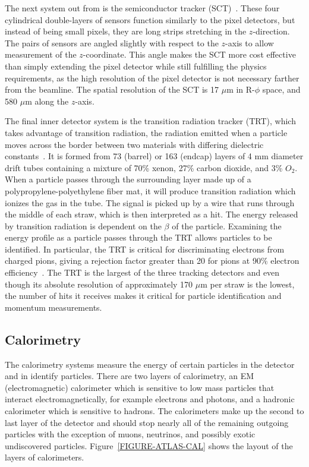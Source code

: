 The next system out from is the semiconductor tracker (SCT)~\cite{SCT}. These four cylindrical double-layers of sensors function similarly to the pixel detectors, but instead of being small pixels, they are long strips stretching in the $z$-direction. The pairs of sensors are angled slightly with respect to the $z$-axis to allow measurement of the $z$-coordinate. This angle makes the SCT more cost effective than simply extending the pixel detector while still fulfilling the physics requirements, as the high resolution of the pixel detector is not necessary farther from the beamline. The spatial resolution of the SCT is 17 $\mu$m in R-$\phi$ space, and 580 $\mu$m along the $z$-axis.

The final inner detector system is the transition radiation tracker (TRT), which takes advantage of transition radiation, the radiation emitted when a particle moves across the border between two materials with differing dielectric constants~\cite{TRT,TRT2}. It is formed from 73 (barrel) or 163 (endcap) layers of 4 mm diameter drift tubes containing a mixture of 70\% xenon, 27\% carbon dioxide, and 3\% $O_2$. When a particle passes through the surrounding layer made up of a  polypropylene-polyethylene fiber mat, it will produce transition radiation which ionizes the gas in the tube. The signal is picked up by a wire that runs through the middle of each straw, which is then interpreted as a hit. The energy released by transition radiation is dependent on the $\beta$ of the particle. Examining the energy profile as a particle passes through the TRT allows particles to be identified. In particular, the TRT is critical for discriminating electrons from charged pions, giving a rejection factor greater than 20 for pions at 90\% electron efficiency~\cite{ATLAS-TDR}. The TRT is the largest of the three tracking detectors and even though its absolute resolution of approximately 170 $\mu$m per straw is the lowest, the number of hits it receives makes it critical for particle identification and momentum measurements. 

\subsection{Calorimetry}
\label{SECTION-ATLAS-CAL}

The calorimetry systems measure the energy of certain particles in the detector and in identify particles. There are two layers of calorimetry, an EM (electromagnetic) calorimeter which is sensitive to low mass particles that interact electromagnetically, for example electrons and photons, and a hadronic calorimeter which is sensitive to hadrons. The calorimeters make up the second to last layer of the detector and should stop nearly all of the remaining outgoing particles with the exception of muons, neutrinos, and possibly exotic undiscovered particles. Figure~\ref{FIGURE-ATLAS-CAL} shows the layout of the layers of calorimeters.

